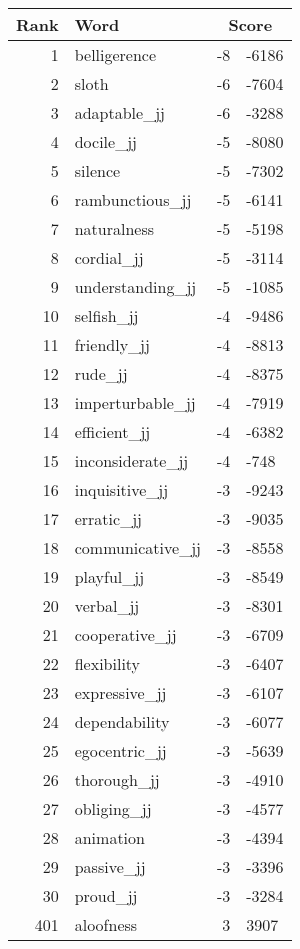 \begin{longtable}[!htbp]{| rlr@{.}l |}
    \hline
    \textbf{Rank} & \textbf{Word} & \multicolumn{2}{c|}{\textbf{Score}} \\
    \hline
    \endhead
    1 & belligerence & -8 & -6186 \\
    2 & sloth & -6 & -7604 \\
    3 & adaptable\_jj & -6 & -3288 \\
    4 & docile\_jj & -5 & -8080 \\
    5 & silence & -5 & -7302 \\
    6 & rambunctious\_jj & -5 & -6141 \\
    7 & naturalness & -5 & -5198 \\
    8 & cordial\_jj & -5 & -3114 \\
    9 & understanding\_jj & -5 & -1085 \\
    10 & selfish\_jj & -4 & -9486 \\
    11 & friendly\_jj & -4 & -8813 \\
    12 & rude\_jj & -4 & -8375 \\
    13 & imperturbable\_jj & -4 & -7919 \\
    14 & efficient\_jj & -4 & -6382 \\
    15 & inconsiderate\_jj & -4 & -748 \\
    16 & inquisitive\_jj & -3 & -9243 \\
    17 & erratic\_jj & -3 & -9035 \\
    18 & communicative\_jj & -3 & -8558 \\
    19 & playful\_jj & -3 & -8549 \\
    20 & verbal\_jj & -3 & -8301 \\
    21 & cooperative\_jj & -3 & -6709 \\
    22 & flexibility & -3 & -6407 \\
    23 & expressive\_jj & -3 & -6107 \\
    24 & dependability & -3 & -6077 \\
    25 & egocentric\_jj & -3 & -5639 \\
    26 & thorough\_jj & -3 & -4910 \\
    27 & obliging\_jj & -3 & -4577 \\
    28 & animation & -3 & -4394 \\
    29 & passive\_jj & -3 & -3396 \\
    30 & proud\_jj & -3 & -3284 \\
    401 & aloofness & 3 & 3907 \\

\end{longtable}
